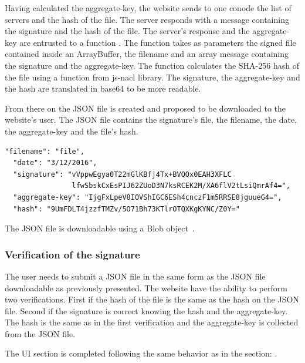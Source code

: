 \documentclass[11pt, a4paper, twoside, openright, openany]{article} %
\begin{document}
Having calculated the aggregate-key, the website sends to one conode the list of servers
and the hash of the file. The server responds with a message containing the signature
and the hash of the file. The server's response and the aggregate-key are entrusted to a function
.
\newline
The function takes as parameters the signed file contained inside an ArrayBuffer,
the filename and an array message containing the signature and the aggregate-key.
The function calculates the SHA-256 hash of the file using a function from js-nacl library.
The signature, the aggregate-key and the hash are translated in base64 to be more readable.
\bigbreak

From there on the JSON file is created and proposed to be downloaded to the website's user.
The JSON file contains the signature's file, the filename, the date, the aggregate-key and the file's hash.
\bigbreak

\begin{lstlisting}[caption={Example a downloadable JSON file}, captionpos=b]
  "filename": "file",
  "date": "3/12/2016",
  "signature": "vVppwEgya0T22mGlKBfj4Tx+BVQQx0EAH3XFLC
                lfwSbskCxEsPIJ62ZUoD3N7ksRCEK2M/XA6flV2tLsiQmrAf4=",
  "aggregate-key": "IjgFxLpeV8IOVShIGC6ESh4cnczF1m5RRSE8jguueG4=",
  "hash": "9UmFDLT4jzzfTMZv/5O71Bh73KTlrOTQXKgKYNC/Z0Y="
\end{lstlisting}
\leavevmode \newline

The JSON file is downloadable using a Blob object~\cite{blob}.
\bigbreak

\subsubsection{Verification of the signature}
The user needs to submit a JSON file in the same form as the JSON file downloadable
as previously presented. The website have the ability to perform two verifications.
\newline
First if the hash of the file is the same as the hash on the JSON file. Second if the signature
is correct knowing the hash and the aggregate-key. The hash is the same as in the first verification
and the aggregate-key is collected from the JSON file.
\bigbreak

The UI section is completed following the same behavior as in the section: .
\bigbreak
\end{document}
